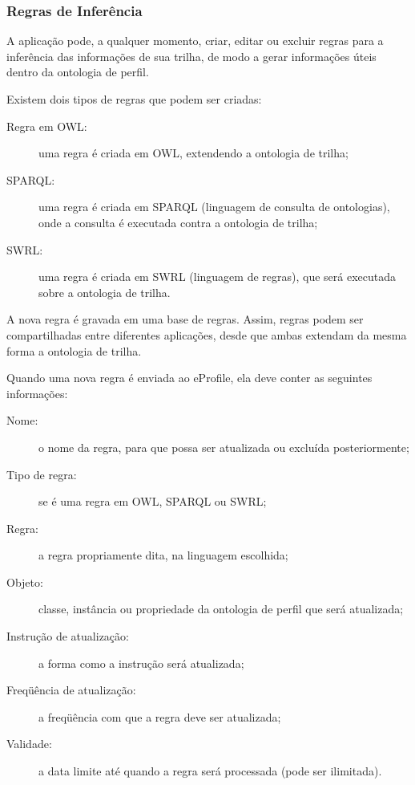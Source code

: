 \subsubsection{Regras de Inferência}

A aplicação pode, a qualquer momento, criar, editar ou excluir regras para a inferência das informações de sua trilha, de modo a gerar informações úteis dentro da ontologia de perfil.

Existem dois tipos de regras que podem ser criadas:

\begin{description}

  \item[Regra em OWL:] uma regra é criada em OWL, extendendo a ontologia de trilha;

  \item[SPARQL:] uma regra é criada em SPARQL (linguagem de consulta de ontologias\cite{sparql}), onde a consulta é executada contra a ontologia de trilha;

  \item[SWRL:] uma regra é criada em SWRL (linguagem de regras\cite{swrl}), que será executada sobre a ontologia de trilha.

\end{description}

A nova regra é gravada em uma base de regras. Assim, regras podem ser compartilhadas entre diferentes aplicações, desde que ambas extendam da mesma forma a ontologia de trilha.

Quando uma nova regra é enviada ao eProfile, ela deve conter as seguintes informações:

\begin{description}
  \item[Nome:] o nome da regra, para que possa ser atualizada ou excluída posteriormente;
  \item[Tipo de regra:] se é uma regra em OWL, SPARQL ou SWRL;
  \item[Regra:] a regra propriamente dita, na linguagem escolhida;
  \item[Objeto:] classe, instância ou propriedade da ontologia de perfil que será atualizada;
  \item[Instrução de atualização:] a forma como a instrução será atualizada;
  \item[Freqüência de atualização:] a freqüência com que a regra deve ser atualizada;
  \item[Validade:] a data limite até quando a regra será processada (pode ser ilimitada).
\end{description}

